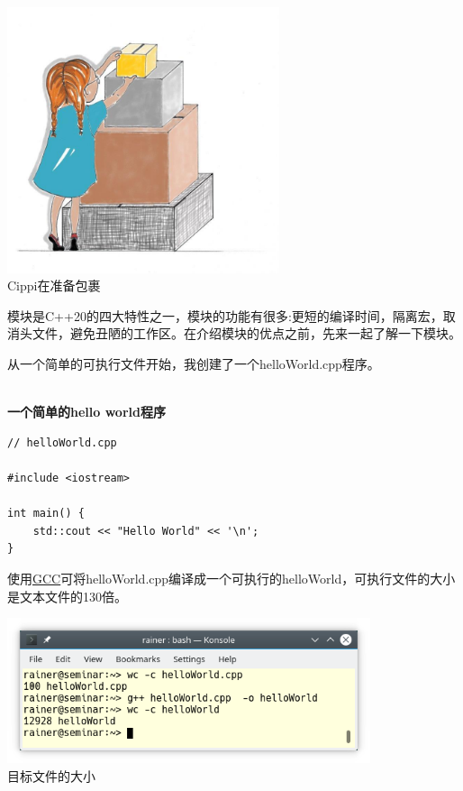 

\begin{center}
\includegraphics[width=0.6\textwidth]{content/3/chapter4/images/11.png}\\
Cippi在准备包裹
\end{center}

模块是C++20的四大特性之一，模块的功能有很多:更短的编译时间，隔离宏，取消头文件，避免丑陋的工作区。在介绍模块的优点之前，先来一起了解一下模块。


从一个简单的可执行文件开始，我创建了一个helloWorld.cpp程序。

\hspace*{\fill} \\ %
\noindent
\textbf{一个简单的hello world程序}
\begin{lstlisting}[style=styleCXX]
// helloWorld.cpp

#include <iostream>

int main() {
	std::cout << "Hello World" << '\n';
}
\end{lstlisting}

使用\href{http://gcc.gnu.org/}{GCC}可将helloWorld.cpp编译成一个可执行的helloWorld，可执行文件的大小是文本文件的130倍。

\begin{center}
\includegraphics[width=0.8\textwidth]{content/3/chapter4/images/12.png}\\
目标文件的大小
\end{center}

